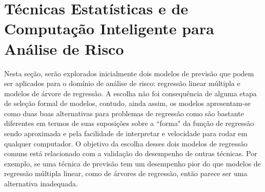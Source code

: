 \section{Técnicas Estatísticas e de Computação Inteligente para Análise de Risco}

Nesta seção, serão explorados inicialmente dois modelos de previsão que podem ser aplicados para o domínio de análise de risco: regressão linear múltipla e modelos de árvore de regressão. A escolha não foi consequência de alguma etapa de seleção formal de modelos, contudo, ainda assim, os modelos apresentam-se como duas boas alternativas para problemas de regressão como são bastante diferentes em termos de suas suposições sobre a ``forma" da função de regressão sendo aproximada e pela facilidade de interpretar e velocidade para rodar em qualquer computador. O objetivo da escolha desses dois modelos de regressão comuns  está relacionado com a validação do desempenho de outras técnicas. Por exemplo, se uma técnica de previsão tem um desempenho pior do que modelos de regressão múltipla linear, como de árvores de regressão, então parece ser uma alternativa inadequada.

